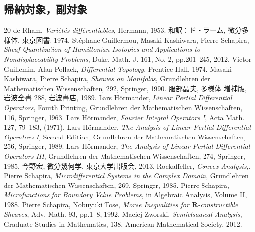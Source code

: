 \documentclass[leqno, 10pt, a4paper, dvipdfmx]{jsarticle}
\theoremstyle{definition}
\newcommand{\rr}{\mathbf{R}}
\numberwithin{equation}{section}
\theoremstyle{mystyle}
\begin{document}
\subsection{帰納対象，副対象}
\begin{thebibliography}{20} 
  de Rham, \textit{Vari\'et\'es diff\'erentiables}, Hermann, 1953.
  和訳：ド・ラーム, 微分多様体, 東京図書, 1974.
   St\'ephane Guillermou, 
  Masaki Kashiwara, Pierre Schapira, 
  \textit{Sheaf Quantization of Hamiltonian Isotopies and Applications to Nondisplaceability Problems}, 
  Duke. Math. J. 161, No. 2, pp.201--245, 2012.  
   Victor Guillemin, Alan Pollack, 
    \textit{Differential Topology}, 
    Prentice-Hall, 1974.
   Masaki Kashiwara, Pierre Schapira, 
    \textit{Sheaves on Manifolds}, 
    Grundlehren der Mathematischen Wissenschaften, 292, Springer, 1990.
   服部晶夫, 多様体 増補版, 岩波全書 288, 岩波書店, 1989.
   Lars H\"ormander, 
  \textit{Linear Pertial Differential Operators}, Fourth Printing, 
  Grundlehren der Mathematischen Wissenschaften, 116, Springer, 1963.
   Lars H\"ormander, 
  \textit{Fourier Integral Operators I}, 
  Acta Math. 127, 79--183, (1971).
   Lars H\"ormander, 
  \textit{The Analysis of Linear Pertial Differential Operators I}, Second Edition,
  Grundlehren der Mathematischen Wissenschaften, 256, Springer, 1989.
   Lars H\"ormander, 
  \textit{The Analysis of Linear Pertial Differential Operators III}, 
  Grundlehren der Mathematischen Wissenschaften, 274, Springer, 1985.
   今野宏, 微分幾何学, 東京大学出版会, 2013.
   Rockaffeller, \textit{Convex Analysis},. 
   Pierre Schapira, 
  \textit{Microdifferential Systems in the Complex Domain}, 
  Grundlehren der Mathematischen Wissenschaften, 269, 
  Springer, 1985.
   Pierre Schapira, 
  \textit{Microfunctions for Boundary Value Problems}, 
  in Algebraic Analysis, Volume II, 1988.
   Pierre Schapira, Nobuyuki Tose, 
  \textit{Morse Inequalities for \(\rr\)-constructible Sheaves}, 
  Adv. Math. 93, pp.1--8, 1992. 
   Maciej Zworski,
  \textit{Semiclsaaical Analysis}, 
  Graduate Studies in Mathematics, 138, American Mathematical Society, 2012. 
\end{thebibliography}

\end{document}

